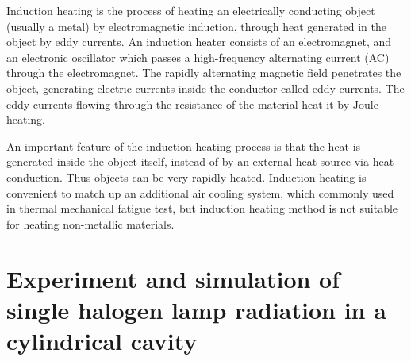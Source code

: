 Induction heating is the process of heating an electrically conducting object (usually a metal) by electromagnetic induction, through heat generated in the object by eddy currents. An induction heater consists of an electromagnet, and an electronic oscillator which passes a high-frequency alternating current (AC) through the electromagnet. The rapidly alternating magnetic field penetrates the object, generating electric currents inside the conductor called eddy currents. The eddy currents flowing through the resistance of the material heat it by Joule heating.

An important feature of the induction heating process is that the heat is generated inside the object itself, instead of by an external heat source via heat conduction. Thus objects can be very rapidly heated.
Induction heating is convenient to match up an additional air cooling system, which commonly used in thermal mechanical fatigue test, but induction heating method is not suitable for heating non-metallic materials.




\section{Experiment and simulation of single halogen lamp radiation in a cylindrical cavity}

